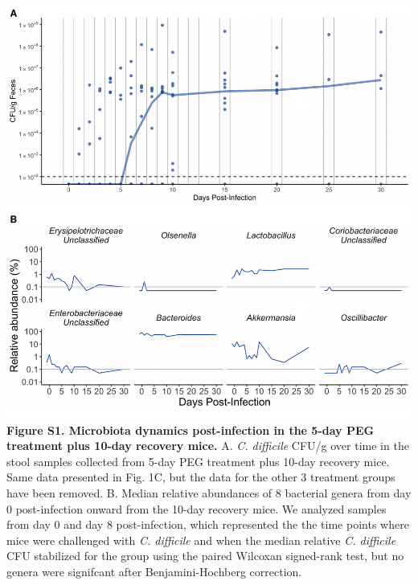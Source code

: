 \documentclass[
  11pt,
]{article}
\begin{document}
\includegraphics{figure_S1.pdf} \textbf{Figure S1. Microbiota dynamics
post-infection in the 5-day PEG treatment plus 10-day recovery mice.} A.
\emph{C. difficile} CFU/g over time in the stool samples collected from
5-day PEG treatment plus 10-day recovery mice. Same data presented in
Fig. 1C, but the data for the other 3 treatment groups have been
removed. B. Median relative abundances of 8 bacterial genera from day 0
post-infection onward from the 10-day recovery mice. We analyzed samples
from day 0 and day 8 post-infection, which represented the the time
points where mice were challenged with \emph{C. difficile} and when the
median relative \emph{C. difficile} CFU stabilized for the group using
the paired Wilcoxan signed-rank test, but no genera were signifcant
after Benjamini-Hochberg correction. \newpage
\end{document}
